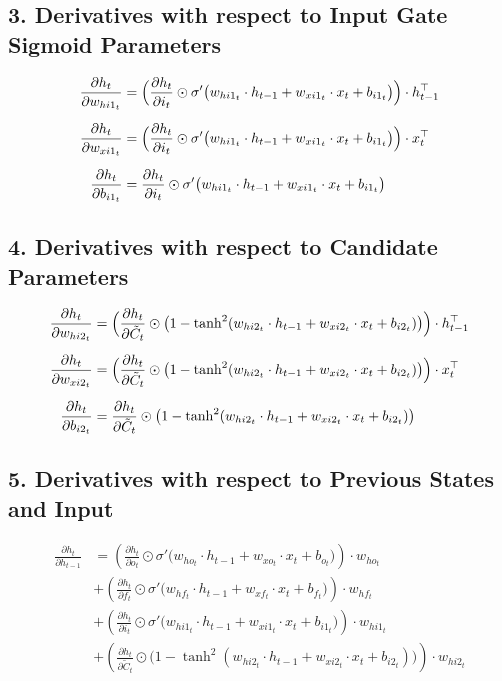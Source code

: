 \documentclass[12pt]{article}
\begin{document}
\subsection*{3. Derivatives with respect to Input Gate Sigmoid Parameters}

\begin{align*}
\frac{\partial h_t}{\partial w_{hi1_t}} &= \Bigl( \frac{\partial h_t}{\partial i_t} \odot \sigma'\bigl(w_{hi1_t} \cdot h_{t-1} + w_{xi1_t} \cdot x_t + b_{i1_t}\bigr) \Bigr) \cdot h_{t-1}^\top \\[6pt]
\frac{\partial h_t}{\partial w_{xi1_t}} &= \Bigl( \frac{\partial h_t}{\partial i_t} \odot \sigma'\bigl(w_{hi1_t} \cdot h_{t-1} + w_{xi1_t} \cdot x_t + b_{i1_t}\bigr) \Bigr) \cdot x_t^\top \\[6pt]
\frac{\partial h_t}{\partial b_{i1_t}}  &= \frac{\partial h_t}{\partial i_t} \odot \sigma'\bigl(w_{hi1_t} \cdot h_{t-1} + w_{xi1_t} \cdot x_t + b_{i1_t}\bigr)
\end{align*}

\subsection*{4. Derivatives with respect to Candidate Parameters}

\begin{align*}
\frac{\partial h_t}{\partial w_{hi2_t}} &= \Bigl( \frac{\partial h_t}{\partial \tilde{C}_t} \odot \bigl(1 - \tanh^2(w_{hi2_t} \cdot h_{t-1} + w_{xi2_t} \cdot x_t + b_{i2_t})\bigr) \Bigr) \cdot h_{t-1}^\top \\[6pt]
\frac{\partial h_t}{\partial w_{xi2_t}} &= \Bigl( \frac{\partial h_t}{\partial \tilde{C}_t} \odot \bigl(1 - \tanh^2(w_{hi2_t} \cdot h_{t-1} + w_{xi2_t} \cdot x_t + b_{i2_t})\bigr) \Bigr) \cdot x_t^\top \\[6pt]
\frac{\partial h_t}{\partial b_{i2_t}}  &= \frac{\partial h_t}{\partial \tilde{C}_t} \odot \bigl(1 - \tanh^2(w_{hi2_t} \cdot h_{t-1} + w_{xi2_t} \cdot x_t + b_{i2_t})\bigr)
\end{align*}

\subsection*{5. Derivatives with respect to Previous States and Input}

\begin{align*}
\frac{\partial h_t}{\partial h_{t-1}} &=
\left( \frac{\partial h_t}{\partial o_t} \odot \sigma'\bigl(w_{ho_t} \cdot h_{t-1} + w_{xo_t} \cdot x_t + b_{o_t}\bigr) \right) \cdot w_{ho_t} \nonumber \\
&+ \left( \frac{\partial h_t}{\partial f_t} \odot \sigma'\bigl(w_{hf_t} \cdot h_{t-1} + w_{xf_t} \cdot x_t + b_{f_t}\bigr) \right) \cdot w_{hf_t} \nonumber \\
&+ \left( \frac{\partial h_t}{\partial i_t} \odot \sigma'\bigl(w_{hi1_t} \cdot h_{t-1} + w_{xi1_t} \cdot x_t + b_{i1_t}\bigr) \right) \cdot w_{hi1_t} \nonumber \\
&+ \left( \frac{\partial h_t}{\partial \tilde{C}_t} \odot \bigl(1 - \tanh^2(w_{hi2_t} \cdot h_{t-1} + w_{xi2_t} \cdot x_t + b_{i2_t})\bigr) \right) \cdot w_{hi2_t}
\end{align*}
\end{document}

